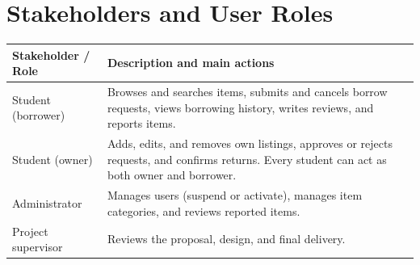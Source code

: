 \documentclass[11pt,a4paper]{article}
\begin{document}
\section{Stakeholders and User Roles}
\begin{tabularx}{\textwidth}{@{}l X@{}}
\toprule
\textbf{Stakeholder / Role} & \textbf{Description and main actions}\\
\midrule
Student (borrower) & Browses and searches items, submits and cancels borrow requests, views borrowing history, writes reviews, and reports items.\\
Student (owner) & Adds, edits, and removes own listings, approves or rejects requests, and confirms returns. Every student can act as both owner and borrower.\\
Administrator & Manages users (suspend or activate), manages item categories, and reviews reported items.\\
Project supervisor & Reviews the proposal, design, and final delivery.\\
\bottomrule
\end{tabularx}

\end{document}
